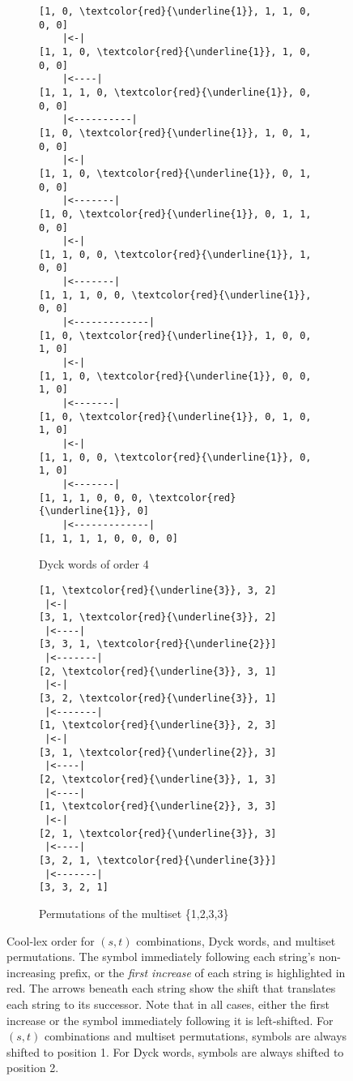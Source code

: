 \begin{figure}
\begin{center}
\begin{subfigure}[]{.32\textwidth}
\begin{center}
\begin{Verbatim}[commandchars=\\\{\}]
[1, 0, \textcolor{red}{\underline{1}}, 1, 1, 0, 0, 0]
    |<-|
[1, 1, 0, \textcolor{red}{\underline{1}}, 1, 0, 0, 0]
    |<----|
[1, 1, 1, 0, \textcolor{red}{\underline{1}}, 0, 0, 0]
    |<----------|
[1, 0, \textcolor{red}{\underline{1}}, 1, 0, 1, 0, 0]
    |<-|
[1, 1, 0, \textcolor{red}{\underline{1}}, 0, 1, 0, 0]
    |<-------|
[1, 0, \textcolor{red}{\underline{1}}, 0, 1, 1, 0, 0]
    |<-|
[1, 1, 0, 0, \textcolor{red}{\underline{1}}, 1, 0, 0]
    |<-------|
[1, 1, 1, 0, 0, \textcolor{red}{\underline{1}}, 0, 0]
    |<-------------|
[1, 0, \textcolor{red}{\underline{1}}, 1, 0, 0, 1, 0]
    |<-|
[1, 1, 0, \textcolor{red}{\underline{1}}, 0, 0, 1, 0]
    |<-------|
[1, 0, \textcolor{red}{\underline{1}}, 0, 1, 0, 1, 0]
    |<-|
[1, 1, 0, 0, \textcolor{red}{\underline{1}}, 0, 1, 0]
    |<-------|
[1, 1, 1, 0, 0, 0, \textcolor{red}{\underline{1}}, 0]
    |<-------------|
[1, 1, 1, 1, 0, 0, 0, 0]

\end{Verbatim}
            \end{center}
            \caption{Dyck words of order 4}
            \label{fig:}
        \end{subfigure}
        \begin{subfigure}[]{.15\textwidth}
            \begin{center}
\begin{Verbatim}[commandchars=\\\{\}]
[1, \textcolor{red}{\underline{3}}, 3, 2]
 |<-|
[3, 1, \textcolor{red}{\underline{3}}, 2]
 |<----|
[3, 3, 1, \textcolor{red}{\underline{2}}]
 |<-------|
[2, \textcolor{red}{\underline{3}}, 3, 1]
 |<-|
[3, 2, \textcolor{red}{\underline{3}}, 1]
 |<-------|
[1, \textcolor{red}{\underline{3}}, 2, 3]
 |<-|
[3, 1, \textcolor{red}{\underline{2}}, 3]
 |<----|
[2, \textcolor{red}{\underline{3}}, 1, 3]
 |<----|
[1, \textcolor{red}{\underline{2}}, 3, 3]
 |<-|
[2, 1, \textcolor{red}{\underline{3}}, 3]
 |<----|
[3, 2, 1, \textcolor{red}{\underline{3}}]
 |<-------|
[3, 3, 2, 1]
\end{Verbatim}
            \end{center}
	    \caption{Permutations of the multiset \{1,2,3,3\}}
            \label{fig:lotsofcool}
        \end{subfigure}
\end{center}
\caption{Cool-lex order for $(s,t)$ combinations, Dyck words, and multiset permutations. The symbol immediately following each string's non-increasing prefix, or the \emph{first increase} of each string is highlighted in red.  The arrows beneath each string show the shift that translates each string to its successor.  Note that in all cases, either the first increase or the symbol immediately following it is left-shifted.  For $(s,t)$ combinations and multiset permutations, symbols are always shifted to position 1.  For Dyck words, symbols are always shifted to position 2.}
\label{fig:}
\end{figure}

